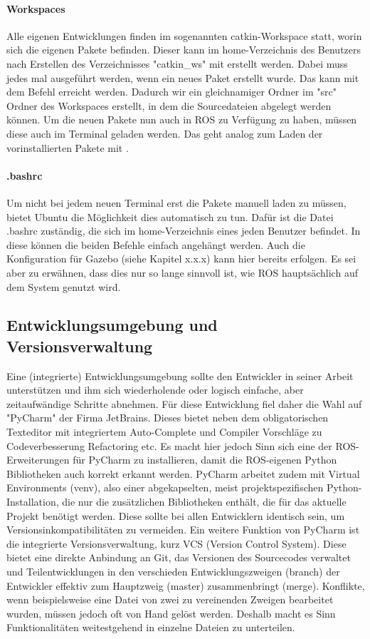 \paragraph{Workspaces}
Alle eigenen Entwicklungen finden im sogenannten catkin-Workspace statt, worin sich die eigenen Pakete befinden. Dieser kann im home-Verzeichnis des Benutzers nach Erstellen des Verzeichnisses "catkin\_ws" mit  erstellt werden. Dabei muss  jedes mal ausgeführt werden, wenn ein neues Paket erstellt wurde. Das kann mit dem Befehl  erreicht werden. Dadurch wir ein gleichnamiger Ordner im "src" Ordner des Workspaces erstellt, in dem die Sourcedateien abgelegt werden können. Um die neuen Pakete nun auch in ROS zu Verfügung zu haben, müssen diese auch im Terminal geladen werden. Das geht analog zum Laden der vorinstallierten Pakete mit . 
\paragraph{.bashrc}
Um nicht bei jedem neuen Terminal erst die Pakete manuell laden zu müssen, bietet Ubuntu die Möglichkeit dies automatisch zu tun. Dafür ist die Datei .bashrc zuständig, die sich im home-Verzeichnis eines jeden Benutzer befindet. In diese können die beiden Befehle einfach angehängt werden. Auch die Konfiguration für Gazebo (siehe Kapitel x.x.x) kann hier bereits erfolgen. Es sei aber zu erwähnen, dass dies nur so lange sinnvoll ist, wie ROS hauptsächlich auf dem System genutzt wird. 
\subsection{Entwicklungsumgebung und Versionsverwaltung}
Eine (integrierte) Entwicklungsumgebung sollte den Entwickler in seiner Arbeit unterstützen und ihm sich wiederholende oder logisch einfache, aber zeitaufwändige Schritte abnehmen. Für diese Entwicklung fiel daher die Wahl auf "PyCharm" der Firma JetBrains. Dieses bietet neben dem obligatorischen Texteditor mit integriertem Auto-Complete und Compiler Vorschläge zu Codeverbesserung Refactoring etc. Es macht hier jedoch Sinn sich eine der ROS-Erweiterungen für PyCharm zu installieren, damit die ROS-eigenen Python Bibliotheken auch korrekt erkannt werden. PyCharm arbeitet zudem mit Virtual Environments (venv), also einer abgekapselten, meist projektspezifischen Python-Installation, die nur die zusätzlichen Bibliotheken enthält, die für das aktuelle Projekt benötigt werden. Diese sollte bei allen Entwicklern identisch sein, um Versionsinkompatibilitäten zu vermeiden. Ein weitere Funktion von PyCharm ist die integrierte Versionsverwaltung, kurz VCS (Version Control System). Diese bietet eine direkte Anbindung an Git, das Versionen des Sourcecodes verwaltet und Teilentwicklungen in den verschieden Entwicklungszweigen (branch) der Entwickler effektiv zum Hauptzweig (master) zusammenbringt (merge). Konflikte, wenn beispielsweise eine Datei von zwei zu vereinenden Zweigen bearbeitet wurden, müssen jedoch oft von Hand gelöst werden. Deshalb macht es Sinn Funktionalitäten weitestgehend in einzelne Dateien zu unterteilen. \cite{martinez2013learning}

